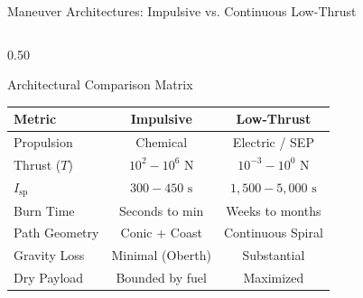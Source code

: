 \documentclass[aspectratio=169, 10pt]{beamer}
\begin{document}
\begin{frame}{Maneuver Architectures: Impulsive vs. Continuous Low-Thrust}
\begin{columns}[T]
        \begin{column}{0.50\textwidth}
            \begin{block}{Architectural Comparison Matrix}
                \scriptsize
                \centering
                \renewcommand{\arraystretch}{1.1}
                \begin{tabular}{lcc}
                    \toprule
                    \textbf{Metric} & \textbf{Impulsive} & \textbf{Low-Thrust} \\
                    \midrule
                    Propulsion & Chemical & Electric / SEP \\
                    Thrust ($T$) & $10^2 - 10^6\text{ N}$ & $10^{-3} - 10^0\text{ N}$ \\
                    $I_{\text{sp}}$ & $300 - 450\text{ s}$ & $1{,}500 - 5{,}000\text{ s}$ \\
                    Burn Time & Seconds to min & Weeks to months \\
                    Path Geometry & Conic + Coast & Continuous Spiral \\
                    Gravity Loss & Minimal (Oberth) & Substantial \\
                    Dry Payload & Bounded by fuel & Maximized \\
                    \bottomrule
                \end{tabular}
            \end{block}
        \end{column}
    \end{columns}
\end{frame}
\end{document}
